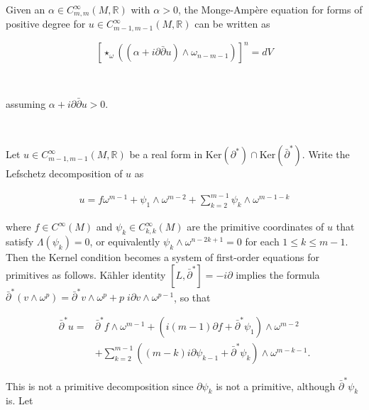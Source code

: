 \documentclass[11pt,letterpaper]{amsart}
\newcommand{\sbpartial}{\bar{\partial}^*}
\newcommand{\pbp}{\partial \bar{\partial}}
\numberwithin{equation}{section}
\begin{document}
Given an $\alpha \in C^{\infty}_{m,m}(M, \mathbb R)$ with $\alpha >0$, the Monge-Amp\`ere equation for forms of positive degree for $u \in C_{m-1,m-1}^{\infty}(M, \mathbb R)$ can be written as

\begin{equation}\label{MA-eqn}
    \left[\star_{\omega}\left((\alpha + i \pbp u)\wedge \omega_{n-m-1}\right)\right]^n = dV
\end{equation}

\ 

\noindent assuming $\alpha + i \pbp u >0$.


\bigskip


{\flushleft {} }
\
\bigskip 

 
Let $u \in C^{\infty}_{m-1,m-1}(M, \mathbb R)$ be a real form in $\mbox{Ker}(\partial^*)\cap \text{Ker}(\bar{\partial}^*)$. Write the Lefschetz decomposition of $u$ as

\begin{equation}
    \begin{aligned}
        u = f \omega^{m-1} + \psi_1 \wedge \omega^{m-2} + \sum\limits_{k =2}^{m-1}\psi_{k} \wedge \omega^{m-1-k}  
    \end{aligned}
\end{equation}


\noindent where $f \in C^{\infty}(M)$ and $\psi_{k} \in C^{\infty}_{k,k}(M)$ are the primitive coordinates of $u$ that satisfy $\Lambda(\psi_k) = 0$, or equivalently $\psi_{k} \wedge \omega^{n-2k+1} = 0$ for each $1 \leq k \leq m-1$. Then the Kernel condition becomes a system of first-order equations for primitives as follows. K\"ahler identity $[L, \sbpartial] = -i \partial $ implies the formula $\sbpartial (v \wedge \omega^p) = \sbpartial v \wedge \omega^{p}+ p \;i \partial v \wedge \omega^{p-1}$, so that

\begin{equation}\label{del-primitive}
    \begin{aligned}
        \sbpartial u = &\sbpartial f \wedge \omega^{m-1} + ( i(m-1)\partial f + \sbpartial \psi_1) \wedge \omega^{m-2} \\
        &+ \sum_{k=2}^{m-1}((m-k)i\partial \psi_{k-1} + \sbpartial \psi_{k} )\wedge\omega^{m-k-1}.
    \end{aligned}
\end{equation}


This is not a primitive decomposition since $\partial \psi_k$ is not a primitive, although $\sbpartial \psi_{k}$ is. Let
\end{document}
